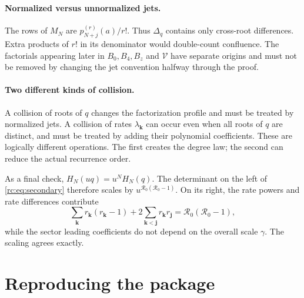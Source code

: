 \documentclass[11pt,a4paper]{article}
\numberwithin{equation}{section}
\theoremstyle{definition}
\theoremstyle{remark}
\newcommand{\bk}{\boldsymbol{k}}
\newcommand{\bj}{\boldsymbol{j}}
\newcommand{\V}{\mathcal V}
\newcommand{\Rzero}{\mathcal R_0}
\begin{document}
\paragraph{Normalized versus unnormalized jets.}
The rows of $M_N$ are $p_{N+j}^{(r)}(a)/r!$.  Thus $\Delta_q$ contains
only cross-root differences.  Extra products of $r!$ in its denominator
would double-count confluence.  The factorials appearing later in
$B_0,B_4,B_z$ and $\V$ have separate origins and must not be removed
by changing the jet convention halfway through the proof.

\paragraph{Two different kinds of collision.}
A collision of roots of $q$ changes the factorization profile and must
be treated by normalized jets.  A collision of rates $\lambda_{\bk}$
can occur even when all roots of $q$ are distinct, and must be treated
by adding their polynomial coefficients.  These are logically different
operations.  The first creates the degree law; the second can reduce
the actual recurrence order.

As a final check, $H_N(uq)=u^N H_N(q)$.  The determinant on the left
of \eqref{rc:eq:secondary} therefore scales by $u^{\Rzero(\Rzero-1)}$.
On its right, the rate powers and rate differences contribute
\[
 \sum_{\bk}r_{\bk}(r_{\bk}-1)
    +2\sum_{\bk<\bj}r_{\bk}r_{\bj}=\Rzero(\Rzero-1),
\]
while the sector leading coefficients do not depend on the overall
scale $\gamma$.  The scaling agrees exactly.


\section{Reproducing the package}\label{rc:app:reproduce}
\end{document}

